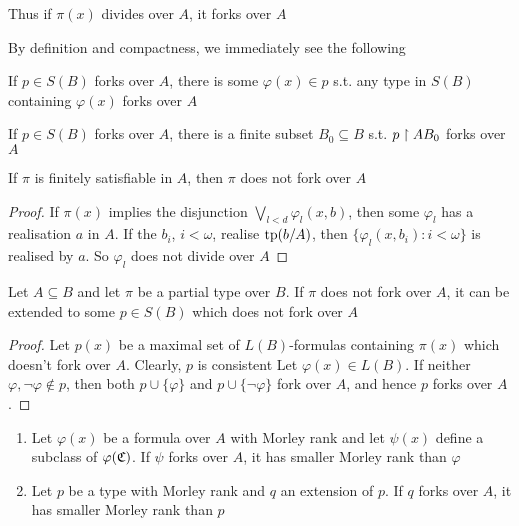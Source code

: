 \documentclass[11pt]{article}
\begin{document}
Thus if \(\pi(x)\) divides over \(A\), it forks over \(A\)

By definition and compactness, we immediately see the following

\begin{remark}
If \(p\in S(B)\) forks over \(A\), there is some \(\varphi(x)\in p\) s.t. any type in \(S(B)\)
containing \(\varphi(x)\) forks over \(A\)
\end{remark}

\begin{corollary}
If \(p\in S(B)\) forks over \(A\), there is a finite subset \(B_0\subseteq B\) s.t. \(p\upharpoonright AB_0\) forks
over \(A\)
\end{corollary}

\begin{lemma}[]
If \(\pi\) is finitely satisfiable in \(A\), then \(\pi\) does not fork over \(A\)
\end{lemma}

\begin{proof}
If \(\pi(x)\) implies the disjunction \(\bigvee_{l<d}\varphi_l(x,b)\), then some \(\varphi_l\) has a
realisation \(a\) in \(A\). If the \(b_i\), \(i<\omega\), realise \(\operatorname{tp}(b/A)\),
then \(\{\varphi_l(x,b_i):i<\omega\}\) is realised by \(a\). So \(\varphi_l\) does not divide over \(A\)
\end{proof}

\begin{lemma}[]
\label{lemma7.1.11}
Let \(A\subseteq B\) and let \(\pi\) be a partial type over \(B\). If \(\pi\) does not fork over \(A\), it can be
extended to some \(p\in S(B)\) which does not fork over \(A\)
\end{lemma}

\begin{proof}
Let \(p(x)\) be a maximal set of \(L(B)\)-formulas containing \(\pi(x)\) which doesn't fork
over \(A\). Clearly, \(p\) is consistent
Let \(\varphi(x)\in L(B)\). If neither \(\varphi,\neg\varphi\notin p\), then
both \(p\cup\{\varphi\}\) and \(p\cup\{\neg\varphi\}\) fork over \(A\), and hence \(p\) forks over \(A\).
\end{proof}

\begin{exercise}
\label{ex7.1.2}
\begin{enumerate}
\item Let \(\varphi(x)\) be a formula over \(A\) with Morley rank and let \(\psi(x)\) define a subclass
of \(\varphi(\mathfrak{C})\). If \(\psi\) forks over \(A\), it has smaller Morley rank than \(\varphi\)
\item Let \(p\) be a type with Morley rank and \(q\) an extension of \(p\). If \(q\) forks
over \(A\), it has smaller Morley rank than \(p\)
\end{enumerate}
\end{exercise}
\end{document}
